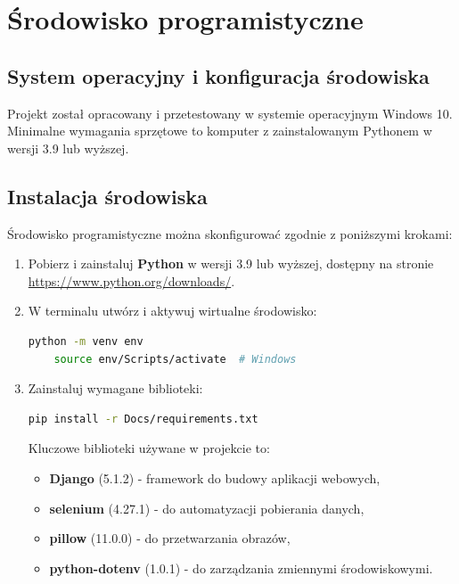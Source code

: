\documentclass[12pt,a4paper,oneside]{article}
\theoremstyle{definition}
\numberwithin{equation}{section}
\begin{document}


\section{Środowisko programistyczne}

\subsection{System operacyjny i konfiguracja środowiska}

Projekt został opracowany i przetestowany w systemie operacyjnym Windows 10. Minimalne wymagania sprzętowe to komputer z zainstalowanym Pythonem w wersji 3.9 lub wyższej.

\subsection{Instalacja środowiska}

Środowisko programistyczne można skonfigurować zgodnie z poniższymi krokami:
\begin{enumerate}
    \item Pobierz i zainstaluj \textbf{Python} w wersji 3.9 lub wyższej, dostępny na stronie \url{https://www.python.org/downloads/}.
    \item W terminalu utwórz i aktywuj wirtualne środowisko:
    \begin{lstlisting}[language=bash]
    python -m venv env
    source env/Scripts/activate  # Windows
    \end{lstlisting}
    \item Zainstaluj wymagane biblioteki:
    \begin{lstlisting}[language=bash]
    pip install -r Docs/requirements.txt
    \end{lstlisting}
    Kluczowe biblioteki używane w projekcie to:
    \begin{itemize}
        \item \textbf{Django} (5.1.2) - framework do budowy aplikacji webowych,
        \item \textbf{selenium} (4.27.1) - do automatyzacji pobierania danych,
        \item \textbf{pillow} (11.0.0) - do przetwarzania obrazów,
        \item \textbf{python-dotenv} (1.0.1) - do zarządzania zmiennymi środowiskowymi.
    \end{itemize}
\end{enumerate}
\end{document}
